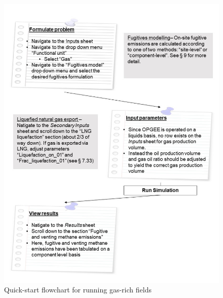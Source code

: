 \documentclass[11pt]{report}
\begin{document}
\begin{figure}[t]
\includegraphics[width=1\columnwidth]{documentation/images/User_Guide_figs/gassy.jpg}
\caption{Quick-start flowchart for running gas-rich fields}
\label{fig:gassy_flow}
\end{figure}

\clearpage
\end{document}
